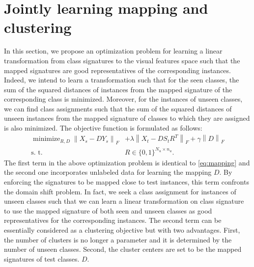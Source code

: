 \documentclass[10pt,twocolumn,letterpaper]{article}
\newcommand{\norm}[1]{\left \lVert #1 \right \rVert_{F}}
\DeclareMathOperator*{\minimize}{minimize}
\begin{document}
\section{Jointly learning mapping and clustering}
\label{joint}
 In this section, we propose an optimization problem for learning a linear transformation from class signatures to the visual features space such that the mapped signatures are good representatives of the corresponding instances. Indeed, we intend to learn a transformation such that for the seen classes, the sum of the squared distances of instances from the mapped signature of the corresponding class is minimized. Moreover, for the instances of unseen classes, we can find class assignments such that the sum of the squared distances of unseen instances from the mapped signature of classes to which they are assigned is also minimized.
 The objective function is formulated as follows:
 \begin{align} \label{eq:main}
   \minimize_{R,D} \norm{X_s - D Y_s}  &+ \lambda \norm{X_t - D S_t R^T } + \gamma \norm{D} \\
   \text{s. t.} \quad & R \in \{0,1\}^{N_u \times n_u}.
 \end{align}
The first term in the above optimization problem is identical to \eqref{eq:mapping} and the second one incorporates unlabeled data for learning the mapping $D$. By enforcing
 the signatures to be mapped close to test instances, this term confronts the domain shift problem. In fact, we seek a class assignment for instances of unseen classes such that we can learn a linear transformation on class signature to use the mapped signature of both seen and unseen classes as good representatives for the corresponding instances. 
 The second term can be essentially considered as a clustering objective but with two advantages. First, the number of clusters is no longer a
 parameter and it is determined by the number of unseen classes. Second, the cluster centers are set to be the mapped signatures of test classes.
$D$.
\end{document}
